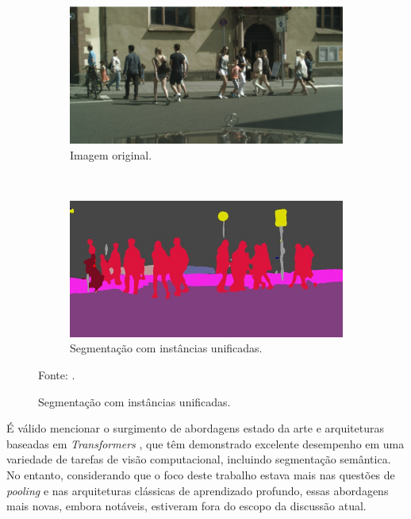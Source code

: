 \begin{figure}[H]
   \caption[Segmentação com instâncias unificadas.]{Exemplo de segmentação semântica com instâncias unificadas.}
   \centering
   \label{semantic:fig:4}
    \begin{subfigure}[t]{0.8\textwidth}
        \centering
        \includegraphics[width=1\linewidth]{recursos/imagens/semantic/sema_ori.png}
        \caption{Imagem original.}
        \label{semantic:fig:4.1}
    \end{subfigure}%
    ~ 

    \begin{subfigure}[t]{0.8\textwidth}
        \centering
        \includegraphics[width=1\linewidth]{recursos/imagens/semantic/sema_unified.png}
        \caption{Segmentação com instâncias unificadas.}
        \label{semantic:fig:4.2}
    \end{subfigure}%

    Fonte: \cite{Fischer2017}.
\end{figure}


É válido mencionar o surgimento de abordagens estado da arte e arquiteturas baseadas em \textit{Transformers} \citep{vaswani2017attention}, que têm demonstrado excelente desempenho em uma variedade de tarefas de visão computacional, incluindo segmentação semântica. No entanto, considerando que o foco deste trabalho estava mais nas questões de \textit{pooling} e nas arquiteturas clássicas de aprendizado profundo, essas abordagens mais novas, embora notáveis, estiveram fora do escopo da discussão atual.

